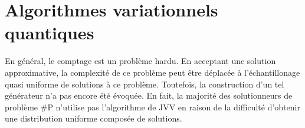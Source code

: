 \chapter{Algorithmes variationnels quantiques}

En général, le comptage est un problème hardu. En acceptant une solution approximative, la complexité de ce problème peut être déplacée à l'échantillonage quasi uniforme de solutions à ce problème. Toutefois, la construction d'un tel générateur n'a pas encore été évoquée. En fait, la majorité des solutionneurs de problème \textsf{\#P} n'utilise pas l'algorithme de JVV en raison de la difficulté d'obtenir une distribution uniforme composée de solutions. 

